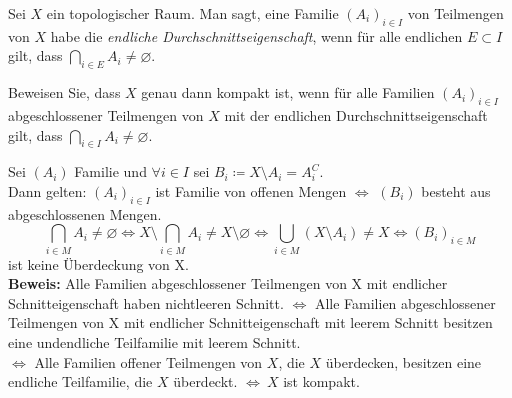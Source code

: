 \begin{assignment}
  Sei \( X \) ein topologischer Raum. Man sagt, eine Familie \( {(A_i)}_{i \in I} \) von Teilmengen von \( X \) habe die \emph{endliche Durchschnittseigenschaft}, wenn für alle endlichen \( E \subset I \) gilt, dass \( \bigcap_{i \in E} A_i \neq \varnothing \).
  
  Beweisen Sie, dass \( X \) genau dann kompakt ist, wenn für alle Familien \( {(A_i)}_{i \in I} \) abgeschlossener Teilmengen von \( X \) mit der endlichen Durchschnittseigenschaft gilt, dass \( \bigcap_{i \in I} A_i \neq \varnothing \).
\end{assignment}
\begin{solution}
  Sei \( (A_i) \) Familie und \( \forall i \in I \) sei \( B_i \coloneqq X \setminus A_i = A_i^{C} \). \\
  Dann gelten: 
  \( {(A_i)}_ { i \in I} \) ist Familie von offenen Mengen \( \Longleftrightarrow \) \( (B_i) \) besteht aus abgeschlossenen Mengen.
  \begin{equation*}
    \bigcap_{i \in M} A_i \neq \varnothing \Leftrightarrow X \setminus \bigcap_{i \in M} A_i \neq X \setminus \varnothing \Leftrightarrow \bigcup_ {i \in M} (X \setminus A_i) \neq X \Longleftrightarrow {(B_i)}_{i \in M} 
  \end{equation*}
  ist keine Überdeckung von X. \\
  \textbf{Beweis:} Alle Familien abgeschlossener Teilmengen von X mit endlicher Schnitteigenschaft haben nichtleeren Schnitt. \( \Leftrightarrow \) Alle Familien abgeschlossener Teilmengen von X mit endlicher Schnitteigenschaft mit leerem Schnitt besitzen eine undendliche Teilfamilie mit leerem Schnitt. \\
  \( \Leftrightarrow \) Alle Familien offener Teilmengen von \( X \), die \( X \) überdecken, besitzen eine endliche Teilfamilie, die \( X \) überdeckt. \( \Longleftrightarrow \ X \) ist kompakt.
\end{solution}

